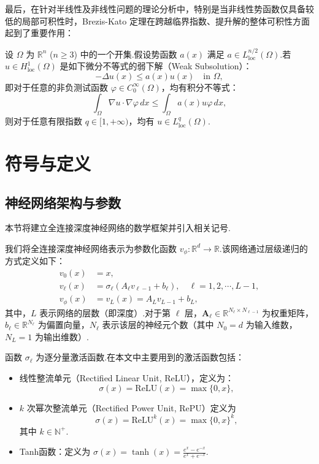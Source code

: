 最后，在针对半线性及非线性问题的理论分析中，特别是当非线性势函数仅具备较低的局部可积性时，Brezis-Kato 定理在跨越临界指数、提升解的整体可积性方面起到了重要作用：
\begin{lemma}\label{lem:Brezis}\cite{brezis1978remarks,willem2012minimax}
设 $\Omega$ 为 $\mathbb{R}^n$ ($n \ge 3$) 中的一个开集.假设势函数 $a(x)$ 满足 $a \in L_{\text{loc}}^{n/2}(\Omega)$.若 $u \in H_{\text{loc}}^1(\Omega)$ 是如下微分不等式的弱下解（Weak Subsolution）：
$$-\Delta u(x) \le a(x) u(x) \quad \text{in } \Omega,$$
即对于任意的非负测试函数 $\varphi \in C_0^\infty(\Omega)$，均有积分不等式：
$$\int_{\Omega} \nabla u \cdot \nabla \varphi \, dx \le \int_{\Omega} a(x)u\varphi \, dx,$$
则对于任意有限指数 $q \in [1, +\infty)$，均有 $u \in L_{\text{loc}}^q(\Omega)$.
\end{lemma}

\section{符号与定义}

\subsection{神经网络架构与参数}
本节将建立全连接深度神经网络的数学框架并引入相关记号.

\begin{definition}\label{def:fnn} 我们将全连接深度神经网络表示为参数化函数 $v_{\phi}: \mathbb{R}^{d} \to \mathbb{R}$.该网络通过层级递归的方式定义如下：
\begin{equation}\label{eq:nn:fcnetwork}
\begin{aligned}
v_{0}(x) &= x, \\
v_{\ell}(x) &= \sigma_{\ell}\left(A_{\ell} v_{\ell-1} + b_{\ell}\right), \quad \ell=1, 2, \cdots, L-1, \\
v_{\phi}(x) &= v_{L}(x) = A_{L} v_{L-1} + b_{L},
\end{aligned}
\end{equation}
其中，$L$ 表示网络的层数（即深度）.对于第 $\ell$ 层，$\boldsymbol{A}_{\ell} \in \mathbb{R}^{N_{\ell} \times N_{\ell-1}}$ 为权重矩阵，$b_{\ell} \in \mathbb{R}^{N_{\ell}}$ 为偏置向量，$N_{\ell}$ 表示该层的神经元个数（其中 $N_0 = d$ 为输入维数， $N_L=1$ 为输出维数）.

函数 $\sigma_{\ell}$ 为逐分量激活函数.在本文中主要用到的激活函数包括：
\begin{itemize}
  \item 线性整流单元（Rectified Linear Unit, ReLU），定义为：
  $$\sigma(x) = \mathrm{ReLU}(x) = \max\{0, x\},$$
  \item $k$ 次幂次整流单元（Rectified Power Unit, RePU）定义为 
  $$\sigma(x) = \mathrm{ReLU}^{k}(x) = \max\{0, x\}^k,$$
  其中 $k \in \mathbb{N}^{+}$.
  \item Tanh函数：定义为 $\sigma(x) = \tanh(x) = \frac{e^{x} - e^{-x}}{e^{x} + e^{-x}}$.
\end{itemize}
\end{definition}


